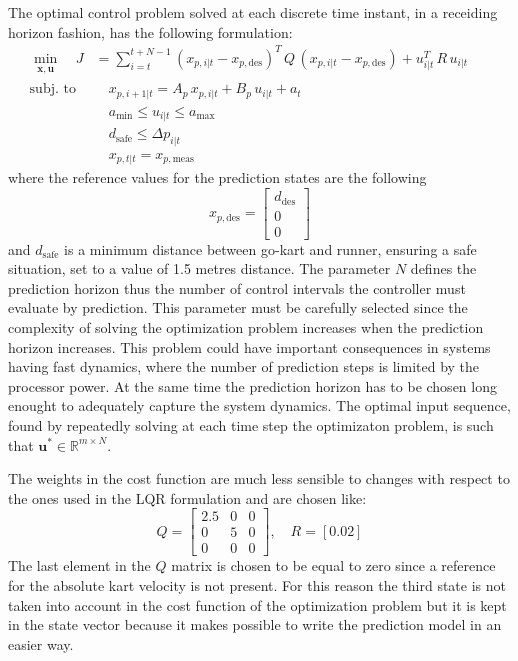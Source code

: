 \documentclass[a4paper,12pt,oneside]{book}
\begin{document}
\bigskip
The optimal control problem solved at each discrete time instant, in a receiding horizon fashion, has the following formulation:
\begin{equation}
\begin{alignedat}{2}
	\min_{\substack{\boldsymbol{x}, \boldsymbol{u}}}\quad J &= \sum_{i=t}^{t+N-1} (x_{p,i|t} - x_{p,\text{des}}) ^T \, Q \, (x_{p,i|t} - x_{p,\text{des}}) +  u_{i|t}^T \, R \, u_{i|t} &&   \\
	\text{subj. to} & \quad x_{p,i+1|t}  = A_p \, x_{p,i|t} + B_p \, u_{i|t} + a_t && \\
    &\quad a_{\text{min}} \leq u_{i|t} \leq a_{\text{max}}&& \\
    &\quad d_{\text{safe}}\leq \Delta p_{i|t} &&  \\
    &\quad x_{p,t|t} = x_{p,\text{meas}} &&
\end{alignedat}
\label{MPC_formulation}
\end{equation}
where the reference values for the prediction states are the following
\begin{equation}
    x_{p,\text{des}} =
    \begin{bmatrix}
        d_{\text{des}}  \\
        0 \\
        0
    \end{bmatrix}
\end{equation}
and $d_{\text{safe}}$ is a minimum distance between go-kart and runner, ensuring a safe situation, set to a value of 1.5 metres distance.
The parameter $N$ defines the prediction horizon thus the number of control intervals the controller must evaluate by prediction. 
This parameter must be carefully selected since the complexity of solving the optimization problem increases when the prediction horizon increases. 
This problem could have important consequences in systems having fast dynamics, where the number of prediction steps is limited by the processor power.
At the same time the prediction horizon has to be chosen long enought to adequately capture the system dynamics.
The optimal input sequence, found by repeatedly solving at each time step the optimizaton problem, is such that $\boldsymbol{u}^* \in \mathbb{R}^{m \times N}$.

The weights in the cost function are much less sensible to changes with respect to the ones used in the LQR formulation and are chosen like:
\begin{equation}
    Q =
    \begin{bmatrix}
        2.5 & 0 & 0 \\
        0 & 5 & 0 \\
        0 & 0 & 0
    \end{bmatrix},
    \quad
    R = [0.02]    
\end{equation}
The last element in the $Q$ matrix is chosen to be equal to zero since a reference for the absolute kart velocity is not present. 
For this reason the third state is not taken into account in the cost function of the optimization problem but it is kept in the state vector because it makes possible to write the prediction model in an easier way.
\end{document}
